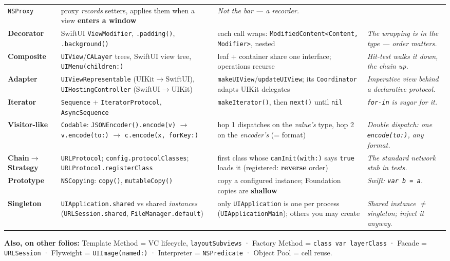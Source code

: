 \documentclass[8pt]{extarticle}
\newcommand\say[1]{\textcolor{sheetBlue}{\emph{#1}}}
\begin{document}
{\begin{tabularx}{\linewidth}{@{}L{16mm}L{50mm}L{53mm}X@{}}
\texttt{NSProxy} & proxy \emph{records} setters, applies them when a view \textbf{enters a
window} & \say{Not the bar — a recorder.} \\
\textbf{Decorator} & SwiftUI \texttt{ViewModifier}, \texttt{.padding()}, \texttt{.background()} &
each call wraps: \texttt{ModifiedContent<Content, Modifier>}, nested & \say{The wrapping is in
the type — order matters.} \\
\textbf{Composite} & \texttt{UIView}/\texttt{CALayer} trees, SwiftUI view tree,
\texttt{UIMenu(children:)} & leaf + container share one interface; operations recurse &
\say{Hit-test walks it down, the chain up.} \\
\textbf{Adapter} & \texttt{UIViewRepresentable} (UIKit$\to$SwiftUI), \texttt{UIHostingController}
(SwiftUI$\to$UIKit) & \texttt{makeUIView}/\texttt{updateUIView}; its \texttt{Coordinator}
adapts UIKit delegates & \say{Imperative view behind a declarative protocol.} \\
\textbf{Iterator} & \texttt{Sequence} + \texttt{IteratorProtocol}, \texttt{AsyncSequence} &
\texttt{makeIterator()}, then \texttt{next()} until \texttt{nil} & \say{\texttt{for-in} is sugar
for it.} \\
\textbf{Visitor-like} & \texttt{Codable}: \texttt{JSONEncoder().encode(v)} $\to$
\texttt{v.encode(to:)} $\to$ \texttt{c.encode(x, forKey:)} & hop 1 dispatches on the
\emph{value's} type, hop 2 on the \emph{encoder's} (= format) & \say{Double dispatch: one
\texttt{encode(to:)}, any format.} \\
\textbf{Chain$\to$Strategy} & \texttt{URLProtocol}; \texttt{config.protocolClasses};
\texttt{URLProtocol.registerClass} & first class whose \texttt{canInit(with:)} says
\texttt{true} loads it (registered: \textbf{reverse} order) & \say{The standard network stub in
tests.} \\
\textbf{Prototype} & \texttt{NSCopying}: \texttt{copy()}, \texttt{mutableCopy()} & copy a
configured instance; Foundation copies are \textbf{shallow} & \say{Swift: \texttt{var b = a}.} \\
\textbf{Singleton} & \texttt{UIApplication.shared} vs shared \emph{instances}
(\texttt{URLSession.shared}, \texttt{FileManager.default}) & only \texttt{UIApplication} is one per
process (\texttt{UIApplicationMain}); others you may create & \say{Shared instance $\neq$
singleton; inject it anyway.} \\
\bottomrule
\end{tabularx}}

{\footnotesize\noindent\textbf{Also, on other folios:} Template Method = VC lifecycle,
\texttt{layoutSubviews} · Factory Method = \texttt{class var layerClass} · Facade =
\texttt{URLSession} · Flyweight = \texttt{UIImage(named:)} · Interpreter = \texttt{NSPredicate} ·
Object Pool = cell reuse.\par}
\end{document}
